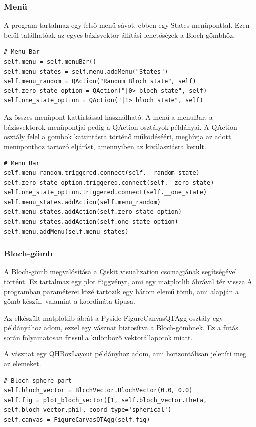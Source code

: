 \documentclass[
]{thesis-ekf}
\theoremstyle{definition}
\theoremstyle{remark}
\begin{document}
\subsubsection{Menü}
A program tartalmaz egy felső menü sávot, ebben egy States menüponttal. Ezen belül találhatóak az egyes bázisvektor állítási lehetőségek a Bloch-gömbhöz. 

\begin{lstlisting}[caption={Menü inicializálása}]
# Menu Bar
self.menu = self.menuBar()
self.menu_states = self.menu.addMenu("States")
self.menu_random = QAction("Random Bloch state", self)
self.zero_state_option = QAction("|0> bloch state", self)
self.one_state_option = QAction("|1> bloch state", self)
\end{lstlisting}

Az összes menüpont kattintással használható. A menü a menuBar, a bázisvektorok menüpontjai pedig a QAction osztályok példányai. A QAction osztály felel a gombok kattintásra történő működéséért, meghívja az adott menüponthoz tartozó eljárást, amennyiben az kiválasztásra került.

\begin{lstlisting}[caption={Menü elemek bekötése}]
# Menu Bar
self.menu_random.triggered.connect(self.__random_state)
self.zero_state_option.triggered.connect(self.__zero_state)
self.one_state_option.triggered.connect(self.__one_state)
self.menu_states.addAction(self.menu_random)
self.menu_states.addAction(self.zero_state_option)
self.menu_states.addAction(self.one_state_option)
self.menu.addMenu(self.menu_states)
\end{lstlisting}

\subsubsection{Bloch-gömb}
A Bloch-gömb megvalósítása a Qiskit visualization csomagjának segítségével történt. Ez tartalmaz egy plot függvényt, ami egy matplotlib ábrával tér vissza.A programban paraméterei közé tartozik egy három elemű tömb, ami alapján a gömb készül, valamint a koordináta típusa. 

Az elkészült matplotlib ábrát a Pyside FigureCanvasQTAgg osztály egy példányához adom, ezzel egy vásznat biztosítva a Bloch-gömbnek. Ez a futás során folyamatosan frissül a különböző vektorállapotok miatt.

A vásznat egy QHBoxLayout példányhoz adom, ami horizontálisan jeleníti meg az elemeket.

\begin{lstlisting}[caption={A Bloch-gömb kezdő állapota a konstruktorban},label=blochspherestart]
# Bloch sphere part
self.bloch_vector = BlochVector.BlochVector(0.0, 0.0)
self.fig = plot_bloch_vector([1, self.bloch_vector.theta, self.bloch_vector.phi], coord_type='spherical')
self.canvas = FigureCanvasQTAgg(self.fig)
\end{lstlisting}
\end{document}
